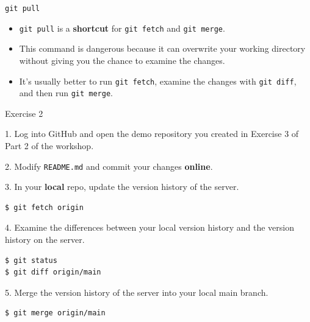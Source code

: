 \documentclass[handout]{beamer}
\begin{document}
\begin{frame}{\texttt{git pull}}
\begin{itemize}
	\item \texttt{git pull} is a \textbf{shortcut} for \texttt{git fetch} and \texttt{git merge}.
	\item This command is \alert{dangerous} because it can overwrite your working directory without giving you the chance to examine the changes. 
	\item It's usually better to run \texttt{git fetch}, examine the changes with \texttt{git diff}, and then run \texttt{git merge}.
\end{itemize}
\end{frame}

\begin{frame}[fragile]{Exercise 2}

1. Log into GitHub and open the demo repository you created in Exercise 3 of Part 2 of the workshop. 

\vspace{0.3cm}

2. Modify \texttt{README.md} and commit your changes \textbf{online}. 

\vspace{0.3cm}

3. In your \textbf{local} repo, update the version history of the server.

\begin{lstlisting}
$ git fetch origin
\end{lstlisting}

4. Examine the differences between your local version history and the version history on the server. 

\begin{lstlisting}
$ git status
$ git diff origin/main
\end{lstlisting}

5. Merge the version history of the server into your local main branch.

\begin{lstlisting}
$ git merge origin/main
\end{lstlisting}
\end{frame}
\end{document}
